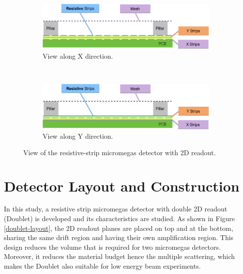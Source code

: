 \documentclass[a4paper,11pt]{article}
\begin{document}
\begin{figure}[h!]
        \centering
     
         \begin{subfigure}[b]{0.45\textwidth}
   	\includegraphics[keepaspectratio=true, width=\textwidth]{Figures/AlongX.png}
	\caption{View along X direction.}
	\label{alongx}
        \end{subfigure}
         ~
         \begin{subfigure}[b]{0.45\textwidth}
        \centering
   	\includegraphics[keepaspectratio=true, width=\textwidth]{Figures/AlongY.png}
	\caption{View along Y direction.}
                \label{alongy}
        \end{subfigure}
         \caption{View of the resistive-strip micromegas detector with 2D readout.}
        \label{mmg2D}
\end{figure}


\section{Detector Layout and Construction}
\label{Sec:Detector}

In this study, a resistive strip micromegas detector with double 2D readout (Doublet) is developed and its characteristics are studied. As shown in Figure \ref{doublet-layout}, the 2D readout planes are placed on top and at the bottom, sharing the same drift region and having their own amplification region. This design reduces the volume that is required for two micromegas detectors. Moreover, it reduces the material budget hence the multiple scattering, which makes the Doublet also suitable for low energy beam experiments. 
\end{document}
